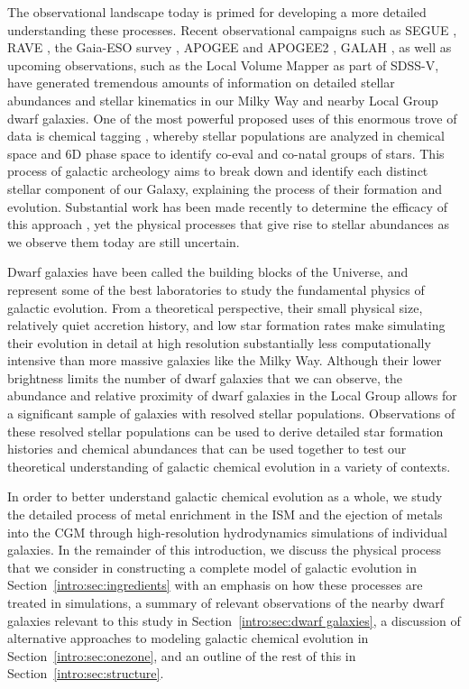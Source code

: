 The observational landscape today is primed for developing a more detailed understanding these processes. Recent observational campaigns such as SEGUE \citep{Yanny2009}, RAVE \citep{Kunder2017}, the Gaia-ESO survey \citep{Gaia}, APOGEE and APOGEE2 \citep{APOGEE2010,APOGEE}, GALAH \citep{GALAH,Buder2018}, as well as upcoming observations, such as the Local Volume Mapper as part of SDSS-V, have generated tremendous amounts of information on detailed stellar abundances and stellar kinematics in our Milky Way and nearby Local Group dwarf galaxies. One of the most powerful proposed uses of this enormous trove of data is chemical tagging \citep{Freeman2002}, whereby stellar populations are analyzed in chemical space and 6D phase space to identify co-eval and co-natal groups of stars. This process of galactic archeology aims to break down and identify each distinct stellar component of our Galaxy, explaining the process of their formation and evolution. Substantial work has been made recently to determine the efficacy of this approach \citep[e.g.][]{Ting2012,Hogg2016,Jofre2017,Price-Jones2018,Armillotta2018}, yet the physical processes that give rise to stellar abundances as we observe them today are still uncertain.


Dwarf galaxies have been called the building blocks of the Universe, and represent some of the best laboratories to study the fundamental physics of galactic evolution. From a theoretical perspective, their small physical size, relatively quiet accretion history, and low star formation rates make simulating their evolution in detail at high resolution substantially less computationally intensive than more massive galaxies like the Milky Way. Although their lower brightness limits the number of dwarf galaxies that we can observe, the abundance and relative proximity of dwarf galaxies in the Local Group allows for a significant sample of galaxies with resolved stellar populations. Observations of these resolved stellar populations can be used to derive detailed star formation histories and chemical abundances that can be used together to test our theoretical understanding of galactic chemical evolution in a variety of contexts.

In order to better understand galactic chemical evolution as a whole, we study the detailed process of metal enrichment in the ISM and the ejection of metals into the CGM through high-resolution hydrodynamics simulations of individual galaxies. In the remainder of this introduction, we discuss the physical process that we consider in constructing a complete model of galactic evolution in Section~\ref{intro:sec:ingredients} with an emphasis on how these processes are treated in simulations, a summary of relevant observations of the nearby dwarf galaxies relevant to this study in Section~\ref{intro:sec:dwarf galaxies}, a discussion of alternative approaches to modeling galactic chemical evolution in Section~\ref{intro:sec:onezone}, and an outline of the rest of this \dissertation in Section~\ref{intro:sec:structure}.

